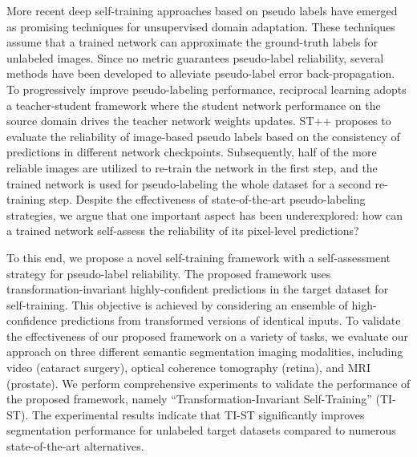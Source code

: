 More recent deep self-training approaches based on pseudo labels have emerged as promising techniques for unsupervised domain adaptation. These techniques assume that a trained network can approximate the ground-truth labels for unlabeled images. Since no metric guarantees pseudo-label reliability, several methods have been developed to alleviate pseudo-label error back-propagation. To progressively improve pseudo-labeling performance, reciprocal learning adopts a teacher-student framework where the student network performance on the source domain drives the teacher network weights updates. ST++ proposes to evaluate the reliability of image-based pseudo labels based on the consistency of predictions in different network checkpoints. Subsequently, half of the more reliable images are utilized to re-train the network in the first step, and the trained network is used for pseudo-labeling the whole dataset for a second re-training step. Despite the effectiveness of state-of-the-art pseudo-labeling strategies, we argue that one important aspect has been underexplored: how can a trained network self-assess the reliability of its pixel-level predictions?

To this end, we propose a novel self-training framework with a self-assessment strategy for pseudo-label reliability. The proposed framework uses transformation-invariant highly-confident predictions in the target dataset for self-training. This objective is achieved by considering an ensemble of high-confidence predictions from transformed versions of identical inputs. To validate the effectiveness of our proposed framework on a variety of tasks, we evaluate our approach on three different semantic segmentation imaging modalities, including video (cataract surgery), optical coherence tomography (retina), and MRI (prostate). We perform comprehensive experiments to validate the performance of the proposed framework, namely ``Transformation-Invariant Self-Training'' (TI-ST). The experimental results indicate that TI-ST significantly improves segmentation performance for unlabeled target datasets compared to numerous state-of-the-art alternatives.
